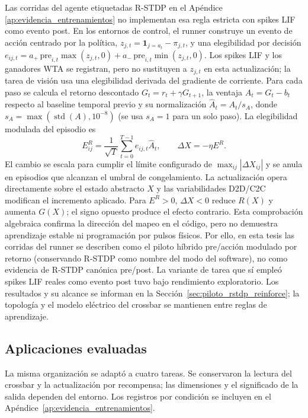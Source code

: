 Las corridas del agente etiquetadas R-STDP en el Ap\'endice
\ref{ap:evidencia_entrenamientos} no implementan esa regla estricta con
spikes LIF como evento post. En los entornos de control, el runner construye
un evento de acci\'on centrado por la pol\'itica,
$z_{j,t}=\mathbf{1}_{j=a_t}-\pi_{j,t}$, y una elegibilidad por decisi\'on
$e_{ij,t}=a_+\,\mathrm{pre}_{i,t}\max(z_{j,t},0)
+a_-\,\mathrm{pre}_{i,t}\min(z_{j,t},0)$. Los spikes LIF y los ganadores
WTA se registran, pero no sustituyen a $z_{j,t}$ en esta actualizaci\'on;
la tarea de visi\'on usa una elegibilidad derivada del gradiente de corriente.
Para cada paso se calcula el retorno descontado $G_t=r_t+\gamma G_{t+1}$,
la ventaja $A_t=G_t-b_t$ respecto al baseline temporal previo y su
normalizaci\'on $\widehat A_t=A_t/s_A$, donde
$s_A=\max(\operatorname{std}(A),10^{-8})$ (se usa $s_A=1$ para un solo
paso). La elegibilidad modulada del episodio es
\[
E^R_{ij}=\frac{1}{\sqrt{T}}\sum_{t=0}^{T-1} e_{ij,t}\widehat A_t,
\qquad \Delta X=-\eta E^R.
\]
El cambio se escala para cumplir el l\'imite configurado de
$\max_{ij}|\Delta X_{ij}|$ y se anula en episodios que alcanzan el umbral
de congelamiento. La actualizaci\'on opera directamente sobre el estado
abstracto $X$ y las variabilidades D2D/C2C modifican el incremento aplicado.
Para $E^R>0$, $\Delta X<0$ reduce $R(X)$ y aumenta $G(X)$; el signo opuesto
produce el efecto contrario. Esta comprobaci\'on algebraica confirma la
direcci\'on del mapeo en el c\'odigo, pero no demuestra aprendizaje estable
ni programaci\'on por pulsos f\'isicos. Por ello, en
esta tesis las corridas del runner se describen como el piloto h\'ibrido
pre/acci\'on modulado por retorno (conservando R-STDP como nombre del modo
del software), no como evidencia de R-STDP can\'onica pre/post. La variante
de tarea que s\'i emple\'o spikes LIF reales como evento post tuvo bajo
rendimiento exploratorio. Los resultados y su alcance se informan en la
Secci\'on~\ref{sec:piloto_rstdp_reinforce}; la topolog\'ia y el modelo
el\'ectrico del crossbar se mantienen entre reglas de aprendizaje.

\subsection{Aplicaciones evaluadas}

La misma organizaci\'on se adapt\'o a cuatro tareas. Se conservaron la lectura
del crossbar y la actualizaci\'on por recompensa; las dimensiones y el
significado de la salida dependen del entorno. Los registros por condici\'on
se incluyen en el Ap\'endice~\ref{ap:evidencia_entrenamientos}.

